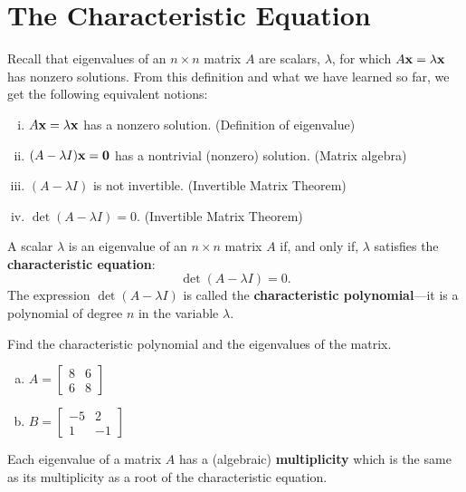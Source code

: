 \newpage


\section{The Characteristic Equation}
\name

\begin{boxme}
	Recall that eigenvalues of an $n\times n$ matrix $A$ are scalars, $\lambda$, for which $A\boldsymbol{\mathbf{x}}=\lambda\boldsymbol{\mathbf{x}}$ has nonzero solutions. From this definition and what we have learned so far, we get the following equivalent notions:
	\begin{enumerate}[(i)]\itemsep0em
		\item $A\boldsymbol{\mathbf{x}}=\lambda\boldsymbol{\mathbf{x}}$ has a nonzero solution.
		\hfill (Definition of eigenvalue)
		\item $(A-\lambda I)\boldsymbol{\mathbf{x}} = \boldsymbol{\mathbf{0}}$ has a nontrivial (nonzero) solution.
		\hfill (Matrix algebra)
		\item $(A - \lambda I)$ is not invertible.
		\hfill (Invertible Matrix Theorem)
		\item $\det(A-\lambda I) = 0$.
		\hfill (Invertible Matrix Theorem)
	\end{enumerate}
	A scalar $\lambda$ is an eigenvalue of an $n\times n$ matrix $A$ if, and only if, $\lambda$ satisfies the \textbf{characteristic equation}:
	\vspace{-1em}
	$$ \det(A-\lambda I) = 0. $$
	The expression $\det(A-\lambda I)$ is called the \textbf{characteristic polynomial}---it is a polynomial of degree $n$ in the variable $\lambda$.
\end{boxme}

\begin{exercise} %
	Find the characteristic polynomial and the eigenvalues of the matrix.
	\begin{multicols}{2}
		\begin{enumerate}[(a)]
			\item $ A= \begin{bmatrix}8&6\\6&8\end{bmatrix} $
			\item $ B= \begin{bmatrix}-5&2\\1&-1\end{bmatrix} $
		\end{enumerate}
	\end{multicols}
\end{exercise}
\vfill


\begin{boxdef}
	Each eigenvalue of a matrix $A$ has a (algebraic) \textbf{multiplicity} which is the same as its multiplicity as a root of the characteristic equation.
\end{boxdef}

